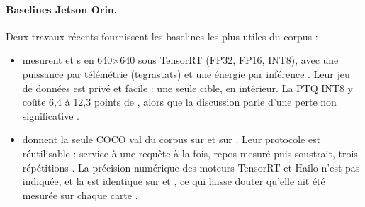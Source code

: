 \paragraph{Baselines Jetson Orin.} Deux travaux récents fournissent les baselines les plus
utiles du corpus :
\begin{itemize}
  \item \citet{arxiv-2502.15737-performance-analysis-you-only-look} mesurent  et s
    en 640$\times$640 sous TensorRT (FP32, FP16, INT8), avec une puissance par télémétrie
    (tegrastats) et une énergie par inférence . Leur jeu de données est
    privé et facile : une seule cible, en intérieur. La PTQ INT8 y coûte 6,4 à 12,3 points
    de , alors que la discussion parle d'une perte non significative .
  \item \citet{arxiv-2409.16808-comprehensive-evaluation-deep-learning-object}\pp{} donnent
    la seule  COCO val du corpus sur  et sur . Leur protocole est
    réutilisable : service à une requête à la fois, repos mesuré puis soustrait, trois
    répétitions . La précision numérique des moteurs TensorRT et Hailo n'est pas
    indiquée, et la  est identique sur  et , ce qui laisse douter
    qu'elle ait été mesurée sur chaque carte .
\end{itemize}

